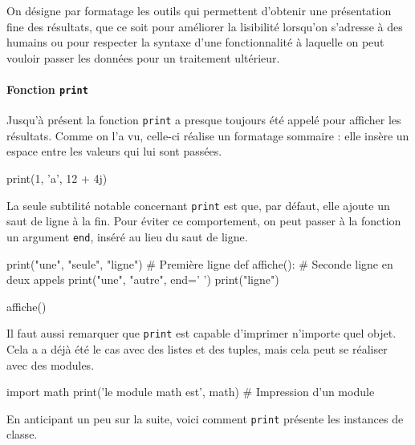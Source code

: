 
On désigne par formatage les outils qui permettent d'obtenir une présentation fine des résultats, que ce soit pour améliorer la lisibilité lorsqu'on s'adresse à des humains ou pour respecter la syntaxe d'une fonctionnalité à laquelle on peut vouloir passer les données pour un traitement ultérieur.

\paragraph{Fonction {\normalfont\texttt{print}}}
Jusqu'à présent la fonction \texttt{print} a presque toujours été appelé pour afficher les résultats. Comme on l'a vu, celle-ci réalise un formatage sommaire : elle insère un espace entre les valeurs qui lui sont passées.

\begin{idleconsole}
	\begin{pyconsole}
		print(1, 'a', 12 + 4j)
\end{pyconsole}
\end{idleconsole}

La seule subtilité notable concernant \texttt{print} est que, par défaut, elle ajoute un saut de ligne à la fin. Pour éviter ce comportement, on peut passer à la fonction un argument \texttt{end}, inséré au lieu du saut de ligne.

\begin{idleconsole}
\begin{pyconsole}
print("une", "seule", "ligne") # Première ligne
def affiche(): # Seconde ligne en deux appels
	print("une", "autre", end=' ') 
	print("ligne")

affiche()
\end{pyconsole}
\end{idleconsole}

Il faut aussi remarquer que \texttt{print} est capable d'imprimer n'importe quel objet. Cela a a déjà été le cas avec des listes et des tuples, mais cela peut se réaliser avec des modules.

\begin{idleconsole}
	\begin{pyconsole}
		import math
		print('le module math est', math) # Impression d'un module
\end{pyconsole}
\end{idleconsole}

En anticipant un peu sur la suite, voici comment \texttt{print} présente les instances de classe.

